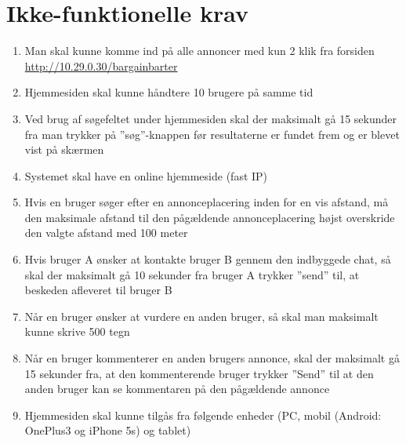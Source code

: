 \chapter{Ikke-funktionelle krav}\label{ch:Ikkefunktionelle}

\begin{enumerate}
	\item Man skal kunne komme ind på alle annoncer med kun 2 klik fra forsiden \url{http://10.29.0.30/bargainbarter}
	
	\item Hjemmesiden skal kunne håndtere 10 brugere på samme tid
	
	\item Ved brug af søgefeltet under hjemmesiden skal der maksimalt gå 15 sekunder fra man trykker på ''søg''-knappen før resultaterne er fundet frem og er blevet vist på skærmen
	
	\item Systemet skal have en online hjemmeside (fast IP)
		
	\item Hvis en bruger søger efter en annonceplacering inden for en vis afstand, må den maksimale afstand til den pågældende annonceplacering højst overskride den valgte afstand med 100 meter
	
	\item Hvis bruger A ønsker at kontakte bruger B gennem den indbyggede chat, så skal der maksimalt  gå 10 sekunder fra bruger A trykker ''send'' til, at beskeden afleveret til bruger B
	
	\item Når en bruger ønsker at vurdere en anden bruger, så skal man maksimalt kunne skrive 500 tegn
	
	\item Når en bruger kommenterer en anden brugers annonce, skal der maksimalt gå 15 sekunder fra, at den kommenterende bruger trykker ''Send'' til at den anden bruger kan se kommentaren på den pågældende annonce
	
	\item Hjemmesiden skal kunne tilgås fra følgende enheder (PC, mobil (Android: OnePlus3 og iPhone 5s) og tablet)
	
\end{enumerate}